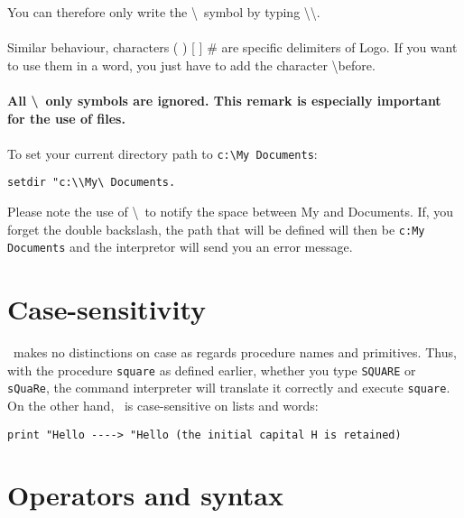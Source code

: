\noindent You can therefore only write the \textbackslash \ symbol by typing \textbackslash\textbackslash.\\ \\
Similar behaviour, characters ( ) [ ] \#  are specific delimiters of Logo. If you want to use them in a word, you just have to add the character \textbackslash before. \\ \\
\textbf{All \textbackslash \ only symbols are ignored. This remark is especially important for the use of files.\\}
\\
 To set your current directory path to \texttt{c:\textbackslash My Documents}:
\begin{verbatim}
setdir "c:\\My\ Documents.
\end{verbatim}

Please note the use of \textbackslash\textvisiblespace \ to notify the space between My and Documents. If, you forget the double backslash, the path that will be defined will then be \texttt{c:My Documents} and the interpretor will send you an error message.

\section{Case-sensitivity}

\xlogo\ makes no distinctions on case as regards procedure names and
primitives. Thus, with the procedure \texttt{square}  as defined earlier,
whether you type \texttt{SQUARE} or \texttt{sQuaRe}, the command interpreter
will translate it correctly and execute \texttt{square}. On the other
hand, \xlogo\ is case-sensitive on lists and words: \\
 \begin{verbatim}
print "Hello ----> "Hello (the initial capital H is retained)
\end{verbatim}


\section{Operators and syntax}

